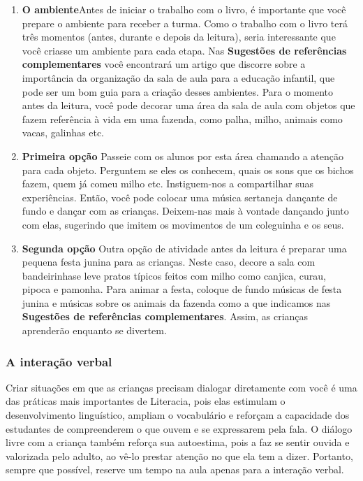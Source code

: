 \documentclass[11pt]{extarticle}
\begin{document}
\begin{enumerate}
\item \textbf{O ambiente}\quad Antes de iniciar o trabalho com o livro, é importante que você 
prepare o ambiente para receber a turma. Como o trabalho com o livro terá 
três momentos (antes, durante e depois da leitura), seria interessante que você 
criasse um ambiente para cada etapa. Nas \textbf{Sugestões de referências complementares} 
você encontrará um artigo que discorre sobre a importância da organização da sala 
de aula para a educação infantil, que pode ser um bom guia para a criação desses 
ambientes. Para o momento antes da leitura, você pode decorar 
uma área da sala de aula com objetos que fazem referência à vida
em uma fazenda, como palha, milho, animais como vacas, galinhas etc.
\item \textbf{Primeira opção}\quad 
Passeie com os alunos por esta área chamando a atenção para cada objeto. 
Perguntem se eles os conhecem, quais os sons que os bichos fazem,
quem já comeu milho etc. Instiguem-nos a compartilhar suas experiências.
Então, você pode colocar uma música sertaneja dançante de fundo e dançar 
com as crianças. Deixem-nas mais à vontade
dançando junto com elas, sugerindo que imitem os movimentos
de um coleguinha e os seus. 


\item \textbf{Segunda opção}\quad 
Outra opção de atividade antes da leitura é preparar uma pequena festa junina
para as crianças. Neste caso, decore a sala com bandeirinhase leve 
pratos típicos feitos com milho como canjica, curau, pipoca e pamonha.
Para animar a festa, coloque de fundo músicas de festa junina e 
músicas sobre os animais da fazenda como a que indicamos nas
\textbf{Sugestões de referências complementares}. Assim,
as crianças aprenderão enquanto se divertem. 
\end{enumerate}


\subsubsection{A interação verbal} 
Criar situações em que as crianças precisam dialogar diretamente com 
você é uma das práticas mais importantes de Literacia, pois elas estimulam 
o desenvolvimento linguístico, ampliam o vocabulário e reforçam a 
capacidade dos estudantes de compreenderem o que ouvem e se expressarem 
pela fala. O diálogo livre com a criança também reforça sua autoestima, pois 
a faz se sentir ouvida e valorizada pelo adulto, ao vê-lo prestar atenção 
no que ela tem a dizer. Portanto, sempre que possível, reserve um tempo na 
aula apenas para a interação verbal. 
\end{document}
